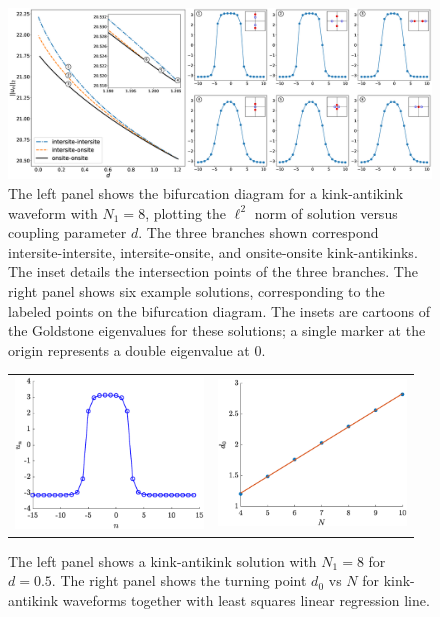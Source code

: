 \documentclass[12pt,reqno]{amsart}
\begin{document}
\begin{figure}[H]
	\begin{center}
	\includegraphics[width=16.5cm]{SGbifdiag.eps}
	\end{center}
	\caption{The left panel shows the bifurcation diagram for a kink-antikink waveform
	with $N_1 = 8$, plotting the $\ell^2$ norm of solution versus coupling parameter $d$. The three branches shown correspond intersite-intersite, intersite-onsite, and onsite-onsite kink-antikinks. The inset details the intersection points of the three branches. The right panel shows six example solutions, corresponding to the labeled points on the bifurcation diagram. The insets are cartoons of the Goldstone eigenvalues for these solutions; a single marker at the origin represents a double eigenvalue at 0.}
	\label{fig:SGbifdiag}
\end{figure}

\begin{figure}[H]
	\begin{center}
	\begin{tabular}{cc}
	\includegraphics[width=5cm]{2kink.eps} &
	\includegraphics[width=5cm]{kakd0vsN.eps}
	\end{tabular}
	\end{center}
	\caption{The left panel shows a kink-antikink solution with $N_1 = 8$ for $d = 0.5$. The right panel shows the turning point $d_0$ vs $N$ for kink-antikink waveforms together with least squares linear regression line.}
	\label{fig:kak}
\end{figure}
\end{document}
